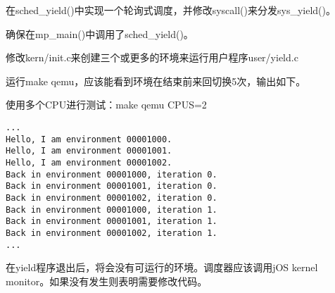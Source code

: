 \begin{exerciseEnv}{6}
    \par 在sched\_yield()中实现一个轮询式调度，并修改syscall()来分发sys\_yield()。
    \par 确保在mp\_main()中调用了sched\_yield()。
    \par 修改kern/init.c来创建三个或更多的环境来运行用户程序user/yield.c
    \par 运行make qemu，应该能看到环境在结束前来回切换5次，输出如下。
    \par 使用多个CPU进行测试：make qemu CPUS=2
    \begin{lstlisting}[numbers=none]
...
Hello, I am environment 00001000.
Hello, I am environment 00001001.
Hello, I am environment 00001002.
Back in environment 00001000, iteration 0.
Back in environment 00001001, iteration 0.
Back in environment 00001002, iteration 0.
Back in environment 00001000, iteration 1.
Back in environment 00001001, iteration 1.
Back in environment 00001002, iteration 1.
...
    \end{lstlisting}
    \par 在yield程序退出后，将会没有可运行的环境。调度器应该调用jOS kernel monitor。如果没有发生则表明需要修改代码。
\end{exerciseEnv}
